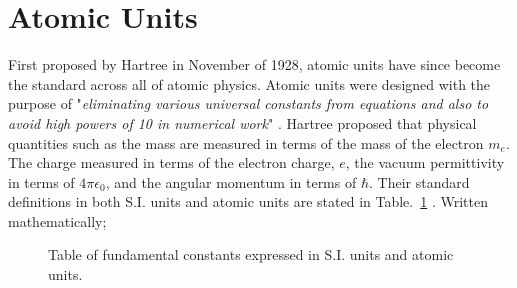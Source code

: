     \section{Atomic Units} \label{sec:atomic_units}    
        First proposed by Hartree in November of 1928, atomic units have since become the standard across all of atomic physics. Atomic units were designed with the purpose of "\textit{eliminating various universal constants from equations and also to avoid high powers of 10 in numerical work}" \cite{atomic_units_definition}. Hartree proposed that physical quantities such as the mass are measured in terms of the mass of the electron $m_e$. The charge measured in terms of the electron charge, $e$, the vacuum permittivity in terms of $4\pi \epsilon_0$, and the angular momentum in terms of $\hbar$. Their standard definitions in both S.I. units and atomic units are stated in Table.~\ref{tab:units} \cite{electron_mass_value, electron_charge_value, fine_structure_value, hbar_value, speed_of_light_value, electric_permittivity_value}. Written mathematically;

        \begin{figure}[b]
            \centering 
            \caption{Table of fundamental constants expressed in S.I. units and atomic units.}\label{tab:units}
        \end{figure}
        
